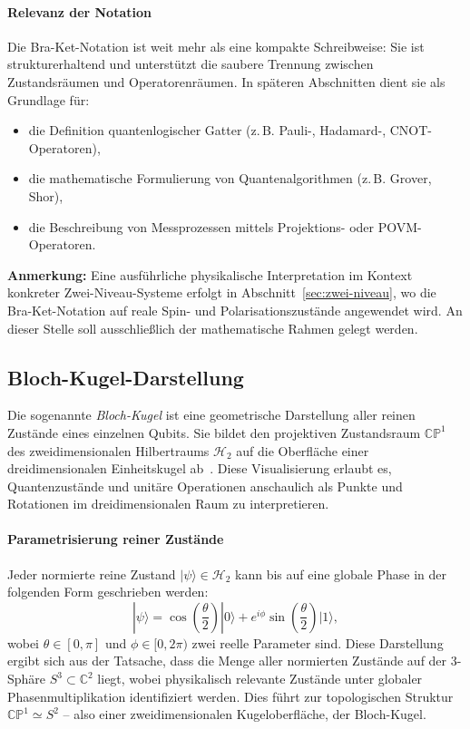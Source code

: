 \paragraph{Relevanz der Notation}
Die Bra-Ket-Notation ist weit mehr als eine kompakte Schreibweise: Sie ist strukturerhaltend und unterstützt die saubere Trennung zwischen Zustandsräumen und Operatorenräumen. In späteren Abschnitten dient sie als Grundlage für:
\begin{itemize}
    \item die Definition quantenlogischer Gatter (z. B. Pauli-, Hadamard-, CNOT-Operatoren),
    \item die mathematische Formulierung von Quantenalgorithmen (z. B. Grover, Shor),
    \item die Beschreibung von Messprozessen mittels Projektions- oder POVM-Operatoren.
\end{itemize}

\vspace{0.5em}
\textbf{Anmerkung:} Eine ausführliche physikalische Interpretation im Kontext konkreter Zwei-Niveau-Systeme erfolgt in Abschnitt~\ref{sec:zwei-niveau}, wo die Bra-Ket-Notation auf reale Spin- und Polarisationszustände angewendet wird. An dieser Stelle soll ausschließlich der mathematische Rahmen gelegt werden.

\subsection{Bloch-Kugel-Darstellung}
\label{sec:bloch}

Die sogenannte \emph{Bloch-Kugel} ist eine geometrische Darstellung aller reinen Zustände eines einzelnen Qubits. Sie bildet den projektiven Zustandsraum $\mathbb{CP}^1$ des zweidimensionalen Hilbertraums $\mathcal{H}_2$ auf die Oberfläche einer dreidimensionalen Einheitskugel ab~\cite{nielsen2002quantum, preskillnotes}. Diese Visualisierung erlaubt es, Quantenzustände und unitäre Operationen anschaulich als Punkte und Rotationen im dreidimensionalen Raum zu interpretieren.

\vspace{0.5em}
\paragraph{Parametrisierung reiner Zustände}

Jeder normierte reine Zustand $|\psi\rangle \in \mathcal{H}_2$ kann bis auf eine globale Phase in der folgenden Form geschrieben werden:
\begin{equation}
|\psi\rangle = \cos\left(\frac{\theta}{2}\right)|0\rangle + e^{i\phi}\sin\left(\frac{\theta}{2}\right)|1\rangle,
\end{equation}
wobei $\theta \in [0, \pi]$ und $\phi \in [0, 2\pi)$ zwei reelle Parameter sind. Diese Darstellung ergibt sich aus der Tatsache, dass die Menge aller normierten Zustände auf der 3-Sphäre $S^3 \subset \mathbb{C}^2$ liegt, wobei physikalisch relevante Zustände unter globaler Phasenmultiplikation identifiziert werden. Dies führt zur topologischen Struktur $\mathbb{CP}^1 \simeq S^2$ – also einer zweidimensionalen Kugeloberfläche, der Bloch-Kugel.

